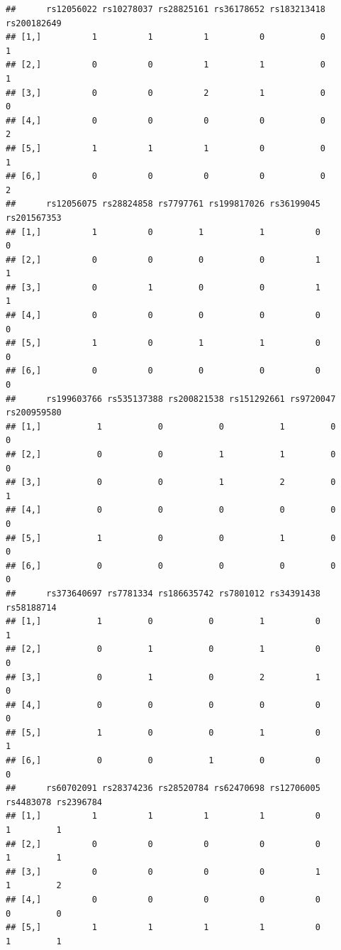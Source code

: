 \documentclass[
]{article}
\begin{document}
\begin{verbatim}
##      rs12056022 rs10278037 rs28825161 rs36178652 rs183213418 rs200182649
## [1,]          1          1          1          0           0           1
## [2,]          0          0          1          1           0           1
## [3,]          0          0          2          1           0           0
## [4,]          0          0          0          0           0           2
## [5,]          1          1          1          0           0           1
## [6,]          0          0          0          0           0           2
##      rs12056075 rs28824858 rs7797761 rs199817026 rs36199045 rs201567353
## [1,]          1          0         1           1          0           0
## [2,]          0          0         0           0          1           1
## [3,]          0          1         0           0          1           1
## [4,]          0          0         0           0          0           0
## [5,]          1          0         1           1          0           0
## [6,]          0          0         0           0          0           0
##      rs199603766 rs535137388 rs200821538 rs151292661 rs9720047 rs200959580
## [1,]           1           0           0           1         0           0
## [2,]           0           0           1           1         0           0
## [3,]           0           0           1           2         0           1
## [4,]           0           0           0           0         0           0
## [5,]           1           0           0           1         0           0
## [6,]           0           0           0           0         0           0
##      rs373640697 rs7781334 rs186635742 rs7801012 rs34391438 rs58188714
## [1,]           1         0           0         1          0          1
## [2,]           0         1           0         1          0          0
## [3,]           0         1           0         2          1          0
## [4,]           0         0           0         0          0          0
## [5,]           1         0           0         1          0          1
## [6,]           0         0           1         0          0          0
##      rs60702091 rs28374236 rs28520784 rs62470698 rs12706005 rs4483078 rs2396784
## [1,]          1          1          1          1          0         1         1
## [2,]          0          0          0          0          0         1         1
## [3,]          0          0          0          0          1         1         2
## [4,]          0          0          0          0          0         0         0
## [5,]          1          1          1          1          0         1         1

\end{verbatim}
\end{document}
